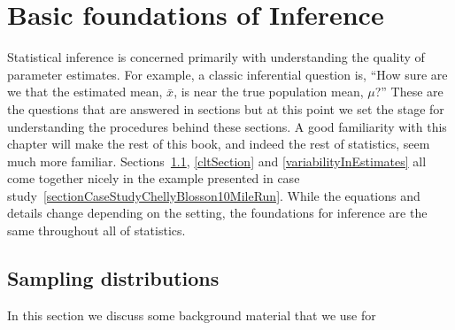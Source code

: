 \chapter{Basic foundations of Inference}
\label{sectionBasicFoundationsForInference}




Statistical inference is concerned primarily with understanding the quality of parameter estimates. For example, a classic inferential question is, ``How sure are we that the estimated mean, $\bar{x}$, is near the true population mean, $\mu$?''
These are the questions that are answered in sections {\color{red}{REFERENCE}}
but at this point we set the stage for understanding the procedures behind these sections.
A good familiarity with this chapter will make the rest of this book, and indeed the rest of statistics, seem much more familiar.
Sections~\ref{sectionSamplingDistribution}, \ref{cltSection} and \ref{variabilityInEstimates} all come together nicely in the example presented in case study~\ref{sectionCaseStudyChellyBlosson10MileRun}.
While the equations and details change depending on the setting, the foundations for inference are the same throughout all of statistics.


\section{Sampling distributions}
\label{sectionSamplingDistribution}



In this section we discuss some background material that we use for  { }

